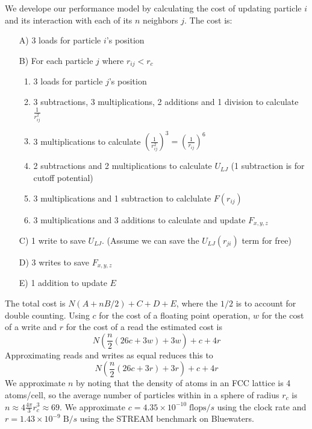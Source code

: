 \documentclass[12pt]{article}
\begin{document}
We develope our performance model by calculating the cost of updating
particle $i$ and its interaction with each of its $n$ neighbors
$j$. The cost is:
\begin{itemize}
\item[A)] 3 loads for particle $i$'s position
\item[B)] For each particle $j$ where $r_{ij}<r_c$
  \begin{enumerate}
    \item $3$ loads for particle $j$'s position
    \item 3 subtractions, 3 multiplications, 2 additions and 1 division to calculate $\frac{1}{r_{ij}^2}$ 
    \item 3 multiplications to calculate $\left(\frac{1}{r_{ij}^2}\right)^3=\left(\frac{1}{r_{ij}}\right)^6$
    \item 2 subtractions and 2 multiplications to calculate $U_{LJ}$ (1 subtraction is for cutoff potential)
    \item 3 multiplications and 1 subtraction to calclulate $F(r_{ij})$
    \item 3 multiplications and 3 additions to calculate and update $F_{x,y,z}$
  \end{enumerate}
\item[C)] 1 write to save $U_{LJ}$. (Assume we can save the $U_{LJ}(r_{ji})$ term for free)
\item[D)] 3 writes to save $F_{x,y,z}$
\item[E)] 1 addition to update $E$
\end{itemize}
The total cost is $N(A+nB/2)+C+D+E$, where the $1/2$ is to account for
double counting. Using $c$ for the cost of a floating point operation,
$w$ for the cost of a write and $r$ for the cost of a read the
estimated cost is
\begin{equation}
N \left(\frac{n}{2} \left(26 c + 3 w\right) + 3 w\right) + c + 4 r
\end{equation}
Approximating reads and writes as equal reduces this to
\begin{equation}
  N \left(\frac{n}{2} \left(26 c + 3 r\right) + 3 r\right) + c + 4 r
\end{equation}
We approximate $n$ by noting that the density of atoms in an FCC
lattice is 4 atoms/cell, so the average number of particles within in
a sphere of radius $r_c$ is $n \approx 4\frac{4\pi}{3}r_c^3\approx69$.
We approximate $c=4.35\times10^{-10}\;\text{flops}/s$ using the clock
rate and $r=1.43\times10^{-9}\;\text{B}/s$ using the STREAM benchmark
on Bluewaters.
\end{document}
